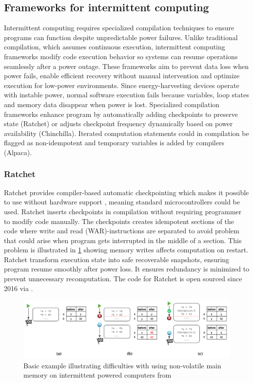 \documentclass[article,a4paper]{IEEEtran}
\begin{document}
\subsection{Frameworks for intermittent computing}
Intermittent computing requires specialized compilation techniques to ensure programs can function despite unpredictable power failures. Unlike traditional compilation, which assumes continuous execution, intermittent computing frameworks modify code execution behavior so systems can resume operations seamlessly after a power outage. These frameworks aim to prevent data loss when power fails, enable efficient recovery without manual intervention and optimize execution for low-power environments. 
\newline\newline
Since energy-harvesting devices operate with instable power, normal software execution fails because variables, loop states and memory data disappear when power is lost. Specialized compilation frameworks enhance program by automatically adding checkpoints to preserve state (Ratchet) or adjusts checkpoint frequency dynamically based on power availability (Chinchilla). Iterated computation statements could in compilation be flagged as non-idempotent and temporary variables is added by compilers (Alpaca). 
\newline
\subsubsection{\textbf{Ratchet}}
Ratchet provides compiler-based automatic checkpointing which makes it possible to use without hardware support \cite{Ratchet}, meaning standard microcontrollers could be used. Ratchet inserts checkpoints in compilation without requiring programmer to modify code manually. The checkpoints creates idempotent sections of the code where write and read (WAR)-instructions are separated to avoid problem that could arise when program gets interrupted in the middle of a section. This problem is illustrated in \ref{fig3_WAR_problem} showing memory writes affects computation on restart. 
\newline\newline
Ratchet transform execution state into safe recoverable snapshots, ensuring program resume smoothly after power loss. It ensures redundancy is minimized to prevent unnecessary recomputation. The code for Ratchet is open sourced since 2016 via \cite{Ratchetsrc}.
\begin{figure}
    \includegraphics[width=\columnwidth]{WAR-problem.png}
    \caption{ Basic example illustrating difficulties with using non-volatile main memory on intermittent powered computers from \cite{Ratchet} }
    \label{fig3_WAR_problem}
\end{figure}
\newline
\end{document}
